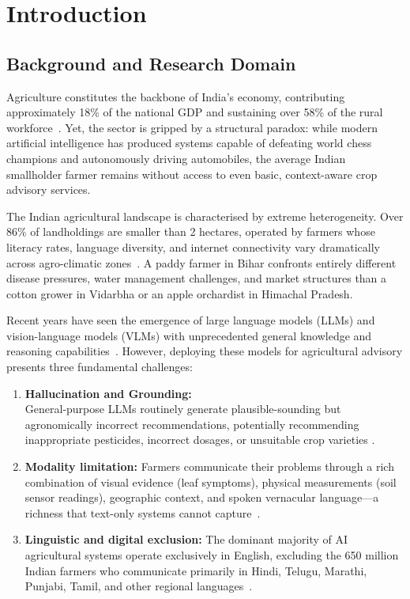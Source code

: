 \documentclass[12pt,a4paper]{article}
\newlength{\defbaselineskip}
\newcommand{\setlinespacing}[1]{\setlength{\baselineskip}{#1 \defbaselineskip}}
\begin{document}
\clearpage
{}
\setcounter{page}{1}
\section{Introduction}
\setlinespacing{1.3}

\subsection{Background and Research Domain}

Agriculture constitutes the backbone of India's economy, contributing approximately 18\% of the national GDP and sustaining over 58\% of the rural workforce~\cite{census2021}. Yet, the sector is gripped by a structural paradox: while modern artificial intelligence has produced systems capable of defeating world chess champions and autonomously driving automobiles, the average Indian smallholder farmer remains without access to even basic, context-aware crop advisory services.

The Indian agricultural landscape is characterised by extreme heterogeneity. Over 86\% of landholdings are smaller than 2 hectares, operated by farmers whose literacy rates, language diversity, and internet connectivity vary dramatically across agro-climatic zones~\cite{census2021,nabard2023}. A paddy farmer in Bihar confronts entirely different disease pressures, water management challenges, and market structures than a cotton grower in Vidarbha or an apple orchardist in Himachal Pradesh.

Recent years have seen the emergence of large language models (LLMs) and vision-language models (VLMs) with unprecedented general knowledge and reasoning capabilities~\cite{agrigpt2025,harnessing2025}. However, deploying these models for agricultural advisory presents three fundamental challenges:

\begin{enumerate}
\item \textbf{Hallucination and Grounding:}\\ General-purpose LLMs routinely generate plausible-sounding but agronomically incorrect recommendations, potentially recommending inappropriate pesticides, incorrect dosages, or unsuitable crop varieties \cite{overcoming2024,agrichain2025}.
\item \textbf{Modality limitation:} Farmers communicate their problems through a rich combination of visual evidence (leaf symptoms), physical measurements (soil sensor readings), geographic context, and spoken vernacular language---a richness that text-only systems cannot capture~\cite{agrimllm2026,agronvila2026}.
\item \textbf{Linguistic and digital exclusion:} The dominant majority of AI agricultural systems operate exclusively in English, excluding the 650 million Indian farmers who communicate primarily in Hindi, Telugu, Marathi, Punjabi, Tamil, and other regional languages~\cite{indicasr2025,bhashini2023}.
\end{enumerate}
\end{document}
